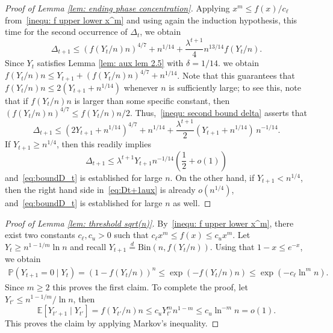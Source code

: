\documentclass[11pt]{article}
\newcommand{\Bin}{\mathrm{Bin}}
\newcommand{\Prob}{\mathbb{P}}
\numberwithin{theorem}{section}
\begin{document}
\begin{proof}[Proof of Lemma \ref{lem: ending phase concentration}]
Applying $x^m\leq f(x)/c_\ell$ from~\eqref{inequ: f upper lower x^m} and using again the induction hypothesis, this time for the second occurrence of $\Delta_t$, we obtain
    \begin{equation}\label{inequ: second bound delta}
        \Delta_{t+1} \leq (f(Y_t/n)n)^{4/7} + n^{1/14} + \frac{\lambda^{t+1}}{4}  n^{13/14}f(Y_t/n).
    \end{equation}
Since $Y_t$ satisfies Lemma \ref{lem: aux lem 2.5} with $\delta=1/14$. we obtain
$f(Y_t/n)n \leq Y_{t+1}+\left(f(Y_t/n)n\right)^{4/7}+n^{1/14}$.
Note that this guarantees that $f(Y_t/n)n \le 2(Y_{t+1} + n^{1/14})$ whenever $n$ is sufficiently large; to see this, note that if $f(Y_t/n)n$ is larger than some specific constant, then $(f(Y_t/n)n)^{4/7} \le f(Y_t/n)n/2$. Thus,~\eqref{inequ: second bound delta} asserts that
\begin{equation}
\label{eq:Dt+1aux}
    \Delta_{t+1} \leq \left(2Y_{t+1} + n^{1/14}\right)^{4/7} + n^{1/14} + \frac{\lambda^{t+1}}{2} (Y_{t+1} + n^{1/14})\, n^{-1/14}.
\end{equation}
If $Y_{t+1} \ge n^{1/4}$, then this readily implies 
\[
    \Delta_{t+1}
    \le {\lambda^{t+1}}Y_{t+1}n^{-1/14} \left(\frac12 + o(1)\right)
\]
and~\eqref{eq:boundD_t} is established for large $n$. On the other hand, if $Y_{t+1} < n^{1/4}$, then the right hand side in~\eqref{eq:Dt+1aux} is already $o(n^{1/4})$, and~\eqref{eq:boundD_t} is established for large $n$ as well.
\end{proof}

\begin{proof}[Proof of Lemma \ref{lem: threshold sqrt(n)}]
    By~\eqref{inequ: f upper lower x^m}, there exist two constants $c_\ell, c_u > 0$ such that $c_\ell x^m \leq f(x) \leq c_ux^m$. 
    Let $Y_t \geq n^{1-1/m}\ln n$ and recall $Y_{t+1} \stackrel{d}{=} \Bin(n,f(Y_{t}/n))$. Using that $1-x\leq e^{-x}$, we obtain
    \begin{align*}
        \Prob(Y_{t+1}=0\mid Y_t) = \left(1-f(Y_{t}/n)\right)^n \leq \exp(-f(Y_{t}/n)n) \leq \exp(-c_\ell \ln^m n).
    \end{align*}
    Since $m\geq 2$ this proves the first claim.
    To complete the proof, let $Y_{t'} \leq n^{1-1/m}/ \ln n$, then
    \[
    \mathbb{E}[Y_{t'+1} \mid Y_{t'}] =  f(Y_{t'}/n)n \leq c_u Y_{t'}^m n^{1-m} \leq c_u \ln^{-m}n = o(1).
    \]
    This proves the claim by applying Markov's inequality.
\end{proof}
\end{document}

